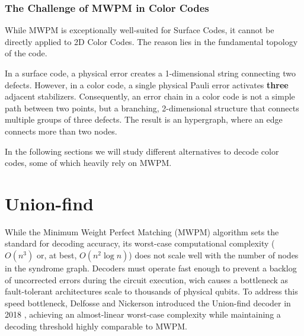 \subsubsection*{The Challenge of MWPM in Color Codes}

While MWPM is exceptionally well-suited for Surface Codes, it cannot be directly applied to 2D Color Codes. The reason lies in the fundamental topology of the code.

In a surface code, a physical error creates a 1-dimensional string connecting two defects. However, in a color code, a single physical Pauli error activates \textbf{three} adjacent stabilizers. Consequently, an error chain in a color code is not a simple path between two points, but a branching, 2-dimensional structure that connects multiple groups of three defects. The result is an hypergraph, where an edge connects more than two nodes.

In the following sections we will study different alternatives to decode color codes, some of which heavily rely on MWPM.

\section{Union-find}
\label{sec:union_find}

 While the Minimum Weight Perfect Matching (MWPM) algorithm sets the standard for decoding accuracy, its worst-case computational complexity ($O(n^3)$ or, at best, $O(n^2 \log{n})$) does not scale well with the number of nodes in the syndrome graph. Decoders must operate fast enough to prevent a backlog of uncorrected errors during the circuit execution, wich causes a bottleneck as fault-tolerant architectures scale to thousands of physical qubits. To address this speed bottleneck, Delfosse and Nickerson introduced the Union-find decoder in 2018 \cite{Delfosse_2021}, achieving an almost-linear worst-case complexity while maintaining a decoding threshold highly comparable to MWPM.


